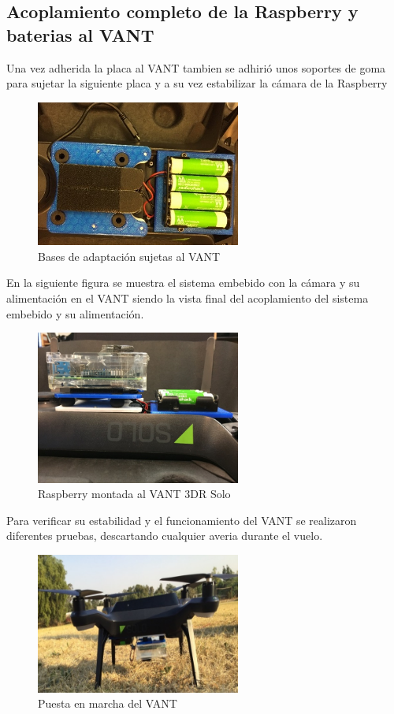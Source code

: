 \documentclass[]{report}
\begin{document}
\subsection{Acoplamiento completo de la Raspberry y baterias al VANT}
Una vez adherida la placa al VANT tambien se adhirió unos soportes de goma para sujetar la siguiente placa y a su vez estabilizar la cámara de la Raspberry
\begin{figure}[!h]
	\centering
	\includegraphics[width=0.6\textwidth]{diez}
	\caption{Bases de adaptación sujetas al VANT}
	\label{adaptacion completa}
\end{figure}

En la siguiente figura se muestra el sistema embebido con la cámara y su alimentación en el VANT siendo la vista final del acoplamiento del sistema embebido y su alimentación.
\begin{figure}[!h]
	\centering
	\includegraphics[width=0.6\textwidth]{doce}
	\caption{Raspberry montada al VANT 3DR Solo}
	\label{vista frontal}
\end{figure}
Para verificar su estabilidad y el funcionamiento del VANT se realizaron diferentes pruebas, descartando cualquier averia durante el vuelo.
\begin{figure}[!h]
	\centering
	\includegraphics[width=0.6\textwidth]{catorce}
	\caption{Puesta en marcha del VANT}
	\label{VANT final}
\end{figure}
\end{document}

